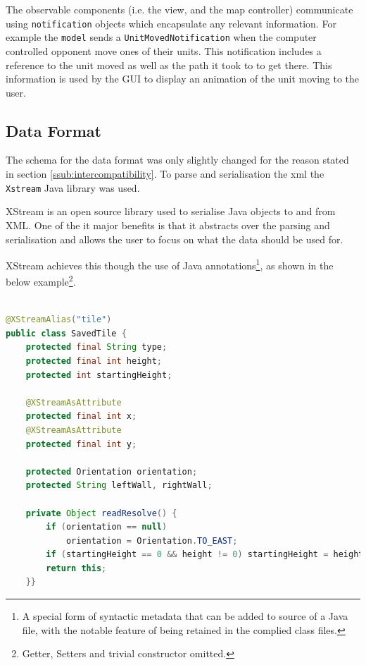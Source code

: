

The observable components (i.e. the view, and the map controller) communicate using \texttt{notification} objects which encapsulate any relevant information. For example the \texttt{model} sends a \texttt{UnitMovedNotification} when the computer controlled opponent move ones of their units. This notification includes a reference to the unit moved as well as the path it took to to get there. This information is used by the GUI to display an animation of the unit moving to the user.

\clearpage
\subsection{Data Format}
The schema for the data format was only slightly changed for the reason stated in section \ref{ssub:intercompatibility}. To parse and serialisation the xml the \texttt{Xstream} Java library was used.

XStream is an open source library used to serialise Java objects to and from XML. One of the it major benefits is that it abstracts over the parsing and serialisation and allows the user to focus on what the data should be used for. 

XStream achieves this though the use of Java annotations\footnote{A special form of syntactic metadata that can be added to source of a Java file, with the notable feature of being retained in the complied class files.}, as shown in the below example\footnote{Getter, Setters and trivial constructor omitted.}.

\begin{lstlisting}[caption=Example of class that is serialisable with XStream, label=lst:SavedTile, language=java] %Java
	
@XStreamAlias("tile")
public class SavedTile {
	protected final String type;
	protected final int height; 
	protected int startingHeight;
	
	@XStreamAsAttribute
	protected final int x;
	@XStreamAsAttribute
	protected final int y;

	protected Orientation orientation;
	protected String leftWall, rightWall;
	
	private Object readResolve() {
		if (orientation == null)  
			orientation = Orientation.TO_EAST;
		if (startingHeight == 0 && height != 0) startingHeight = height;
		return this;
	}}
\end{lstlisting}

